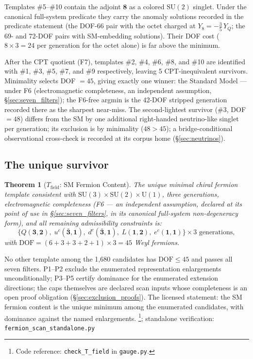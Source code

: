 \documentclass[11pt]{article}
\newtheorem{theorem}{Theorem}[section]
\theoremstyle{definition}
\newcommand{\SU}{\mathrm{SU}}
\newcommand{\U}{\mathrm{U}}
\newcommand{\coderef}[2]{\footnote{Code reference: \texttt{#1} in \texttt{#2}.}}
\begin{document}
\smallskip\noindent Templates \#5--\#10 contain the adjoint
$\mathbf{8}$ as a colored $\SU(2)$ singlet.  Under the canonical
full-system predicate they carry the anomaly solutions recorded in
the predicate statement (the DOF-66 pair with the octet charged at
$Y_8 = -\tfrac{3}{5}\,Y_Q$; the 69- and 72-DOF pairs with
SM-embedding solutions).  Their DOF cost ($8 \times 3 = 24$ per
generation for the octet alone) is far above the minimum.

\smallskip\noindent After the CPT quotient (F7), templates \#2, \#4,
\#6, \#8, and \#10 are identified with \#1, \#3, \#5, \#7, and \#9
respectively, leaving 5 CPT-inequivalent survivors.  Minimality selects DOF $= 45$,
giving exactly one winner: the Standard Model --- under F6
(electromagnetic completeness, an independent assumption,
\S\ref{sec:seven_filters}); the F6-free argmin is the 42-DOF stripped
generation recorded there as the sharpest near-miss.  The second-lightest
survivor (\#3, DOF $= 48$) differs from the SM by one additional
right-handed neutrino-like singlet per generation;
its exclusion is by minimality ($48 > 45$); a bridge-conditional
observational cross-check is recorded at its corpus home
(\S\ref{sec:neutrinos}).


\subsection{The unique survivor}
\label{sec:unique_survivor}

\begin{theorem}[$T_{\mathrm{field}}$: SM Fermion Content]\label{thm:Tfield}
The unique minimal chiral fermion template consistent with
$\SU(3) \times \SU(2) \times \U(1)$, three generations,
electromagnetic completeness (F6 --- an independent assumption,
declared at its point of use in \S\ref{sec:seven_filters}, in its
canonical full-system non-degeneracy form), and all
remaining admissibility constraints is:
\[
  \{Q(\mathbf{3},\mathbf{2}),\;
    u^c(\bar{\mathbf{3}},\mathbf{1}),\;
    d^c(\bar{\mathbf{3}},\mathbf{1}),\;
    L(\mathbf{1},\mathbf{2}),\;
    e^c(\mathbf{1},\mathbf{1})\}
  \times 3 \text{ generations},
\]
with $\mathrm{DOF} = (6+3+3+2+1) \times 3 = 45$ Weyl fermions.
\end{theorem}

\noindent No other template among the 1{,}680 candidates has
$\mathrm{DOF} \le 45$ and passes all seven filters.  P1--P2 exclude
the enumerated representation enlargements unconditionally; P3--P5
certify dominance for the enumerated extension directions; the caps
themselves are declared scan inputs whose completeness is an open
proof obligation (\S\ref{sec:exclusion_proofs}).  The licensed
statement: the SM fermion content is the unique minimum among the
enumerated candidates, with dominance against the named enlargements.
\coderef{check\_T\_field}{gauge.py}; standalone verification: \texttt{fermion\_scan\_standalone.py}~\cite{BrookeFermionScan}
\end{document}
